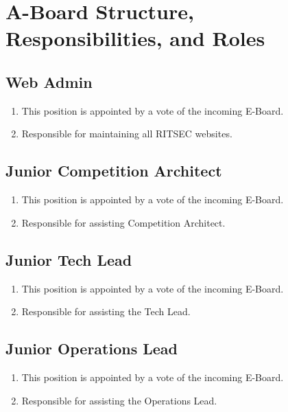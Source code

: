 
\section{A-Board Structure, Responsibilities, and Roles}

\subsection{Web Admin}

\begin{enumerate}
  \item This position is appointed by a vote of the incoming E-Board. 
  \item Responsible for maintaining all RITSEC websites.
\end{enumerate}

\subsection{Junior Competition Architect}

\begin{enumerate}
  \item This position is appointed by a vote of the incoming E-Board.
  \item Responsible for assisting Competition Architect.
\end{enumerate}

\subsection{Junior Tech Lead}

\begin{enumerate}
  \item This position is appointed by a vote of the incoming E-Board.
  \item Responsible for assisting the Tech Lead.
\end{enumerate}

\subsection{Junior Operations Lead}

\begin{enumerate}
  \item This position is appointed by a vote of the incoming E-Board.
  \item Responsible for assisting the Operations Lead.
\end{enumerate}